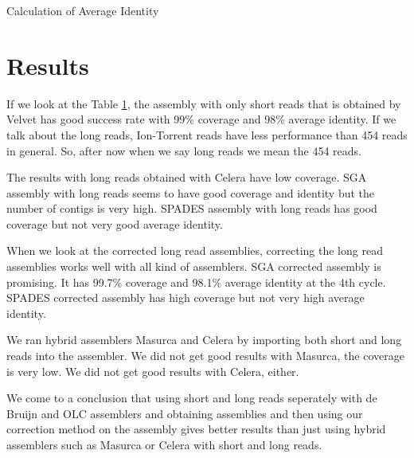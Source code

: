 \documentclass[12pt]{article}
\begin{document}
\begin{algorithm}
\caption{Calculation of Average Identity}
\label{avgIdentity}
\begin{algorithmic} 
\ENDWHILE
{}
\end{algorithmic}
\end{algorithm}

\section{Results}
\label{res}
If we look at the Table \ref{res}, the assembly with only short reads that is obtained by Velvet has good success rate with 99\% coverage and 98\% average identity. 
If we talk about the long reads, Ion-Torrent reads have less performance than 454 reads in general. So, after now when we say long reads we mean the 454 reads.

The results with long reads obtained with Celera have low coverage. 
SGA assembly with long reads seems to have good coverage and identity but the number of contigs is very high. 
SPADES assembly with long reads has good coverage but not very good average identity. 

When we look at the corrected long read assemblies, correcting the long read assemblies works well with all kind of assemblers. SGA corrected assembly is promising. It has 99.7\% coverage and 98.1\% average identity at the 4th cycle. SPADES corrected assembly has high coverage but not very high average identity. 

We ran hybrid assemblers Masurca and Celera by importing both short and long reads into the assembler. We did not get good results with Masurca, the coverage is very low. We did not get good results with Celera, either.

We come to a conclusion that using short and long reads seperately with de Bruijn and OLC assemblers and obtaining assemblies and then using our correction method on the assembly gives better results than just using hybrid assemblers such as Masurca or Celera with short and long reads.
\end{document}
